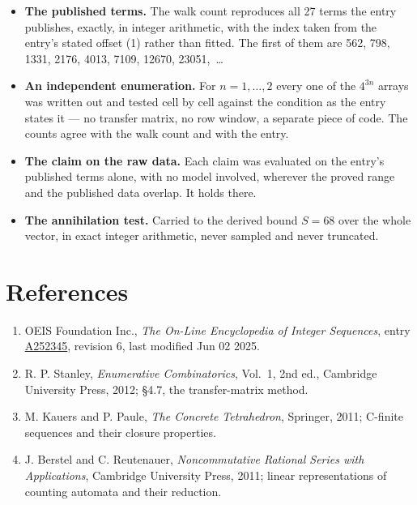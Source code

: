 \documentclass[11pt]{article}
\theoremstyle{definition}
\begin{document}
\begin{itemize}

\item {\bfseries The published terms.} The walk count reproduces all 27 terms the entry publishes, exactly, in integer arithmetic, with the index taken from the entry's stated offset (1) rather than fitted. The first of them are 562, 798, 1331, 2176, 4013, 7109, 12670, 23051,~\dots

\item {\bfseries An independent enumeration.} For $n = 1,\dots,2$ every one of the $4^{3n}$ arrays was written out and tested cell by cell against the condition as the entry states it --- no transfer matrix, no row window, a separate piece of code. The counts agree with the walk count and with the entry.

\item {\bfseries The claim on the raw data.} Each claim was evaluated on the entry's published terms alone, with no model involved, wherever the proved range and the published data overlap. It holds there.

\item {\bfseries The annihilation test.} Carried to the derived bound $S = 68$ over the whole vector, in exact integer arithmetic, never sampled and never truncated.

\end{itemize}

\section{References}

\begin{enumerate}

\item OEIS Foundation Inc., \emph{The On-Line Encyclopedia of Integer Sequences}, entry \href{https://oeis.org/A252345}{A252345}, revision 6, last modified Jun 02 2025.

\item R. P. Stanley, \emph{Enumerative Combinatorics}, Vol.~1, 2nd ed., Cambridge University Press, 2012; \S4.7, the transfer-matrix method.

\item M. Kauers and P. Paule, \emph{The Concrete Tetrahedron}, Springer, 2011; C-finite sequences and their closure properties.

\item J. Berstel and C. Reutenauer, \emph{Noncommutative Rational Series with Applications}, Cambridge University Press, 2011; linear representations of counting automata and their reduction.

\end{enumerate}
\end{document}
